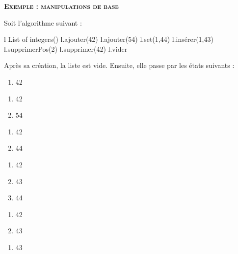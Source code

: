 \clearpage

		{\sffamily\bfseries\scshape
		Exemple : manipulations de base}
		
		Soit l'algorithme suivant :
		
		\begin{LDA}
				\Let l \Gets {} List of integers()
				\Stmt l.ajouter(42)
				\Stmt l.ajouter(54)
				\Stmt l.set(1,44)
				\Stmt l.insérer(1,43)
				\Stmt l.supprimerPos(2)
				\Stmt l.supprimer(42)
				\Stmt l.vider
			\EndAlgo
		\end{LDA}
		
		Après sa création, la liste est vide.
		Ensuite, elle passe par les états suivants :
		
		\begin{minipage}[t]{2cm}
		\begin{enumerate}[start=0]
		\item 42
		\end{enumerate}
		\end{minipage}
		\begin{minipage}[t]{2cm}
		\begin{enumerate}[start=0]
		\item 42
		\item 54
		\end{enumerate}
		\end{minipage}
		\begin{minipage}[t]{2cm}
		\begin{enumerate}[start=0]
		\item 42
		\item 44
		\end{enumerate}
		\end{minipage}
		\begin{minipage}[t]{2cm}
		\begin{enumerate}[start=0]
		\item 42
		\item 43
		\item 44
		\end{enumerate}
		\end{minipage}
		\begin{minipage}[t]{2cm}
		\begin{enumerate}[start=0]
		\item 42
		\item 43
		\end{enumerate}
		\end{minipage}
		\begin{minipage}[t]{2cm}
		\begin{enumerate}[start=0]
		\item 43
		\end{enumerate}
		\end{minipage}
		
